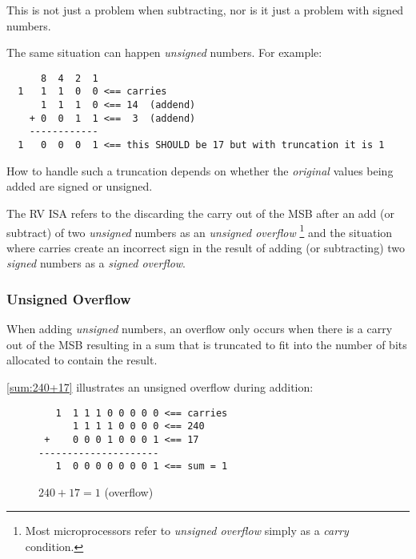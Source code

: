 

This is not just a problem when subtracting, nor is it just a problem with
signed numbers.

The same situation can happen {\em unsigned} numbers. 
For example:

\begin{verbatim}
      8  4  2  1
  1   1  1  0  0 <== carries
      1  1  1  0 <== 14  (addend)
    + 0  0  1  1 <==  3  (addend)
    ------------
  1   0  0  0  1 <== this SHOULD be 17 but with truncation it is 1
\end{verbatim}


How to handle such a truncation depends on whether the {\em original} values 
being added are signed or unsigned.

The RV ISA refers to the discarding the carry out of the MSB after an 
add (or subtract) of two {\em unsigned} numbers as an {\em unsigned overflow}%
\footnote{Most microprocessors refer to {\em unsigned overflow} simply as a 
{\em carry} condition.}
and the situation where carries create an incorrect sign in the
result of adding (or subtracting) two {\em signed} numbers as a
{\em signed overflow}.~\cite[p.~13]{rvismv1v22:2017}

\subsubsection{Unsigned Overflow}

When adding {\em unsigned} numbers, an overflow only occurs when there 
is a carry out of the MSB resulting in a sum that is truncated to fit 
into the number of bits allocated to contain the result.

\autoref{sum:240+17} illustrates an unsigned overflow during addition:

\begin{figure}[H]
\centering
\begin{BVerbatim}
   1  1 1 1 0 0 0 0 0 <== carries
      1 1 1 1 0 0 0 0 <== 240
 +    0 0 0 1 0 0 0 1 <== 17
---------------------
   1  0 0 0 0 0 0 0 1 <== sum = 1
\end{BVerbatim}
\caption{$240+17=1$ (overflow)}
\label{sum:240+17}
\end{figure}

